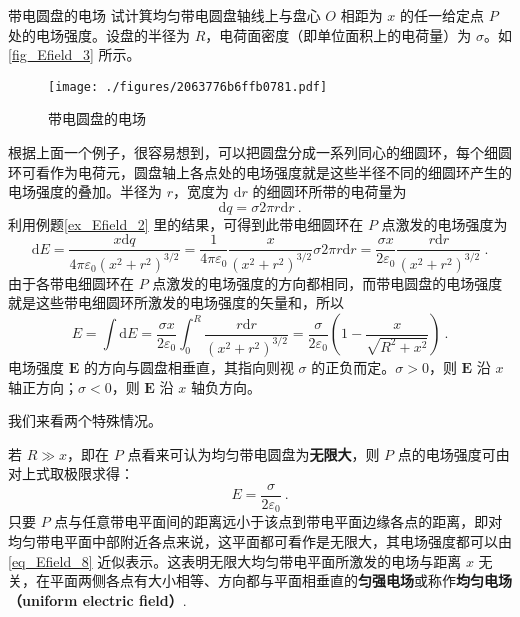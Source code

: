  
\begin{example}{带电圆盘的电场}\label{ex_Efield_3}
试计箕均匀带电圆盘轴线上与盘心 $O$ 相距为 $x$ 的任一给定点 $P$ 处的电场强度。设盘的半径为 $R$，电荷面密度（即单位面积上的电荷量）为 $\sigma$。如\autoref{fig_Efield_3} 所示。

\begin{figure}[ht]
\centering
\texttt{[image: ./figures/2063776b6ffb0781.pdf]}
\caption{带电圆盘的电场} \label{fig_Efield_3}
\end{figure}

根据上面一个例子，很容易想到，可以把圆盘分成一系列同心的细圆环，每个细圆环可看作为电荷元，圆盘轴上各点处的电场强度就是这些半径不同的细圆环产生的电场强度的叠加。半径为 $r$，宽度为 $\mathrm dr$ 的细圆环所带的电荷量为
\begin{equation}
\mathrm{d} q=\sigma 2 \pi r \mathrm{d} r~.
\end{equation}
利用例题\autoref{ex_Efield_2} 里的结果，可得到此带电细圆环在 $P$ 点激发的电场强度为
\begin{equation}
\mathrm{d} E=\frac{x \mathrm{d} q}{4 \pi \varepsilon_{0}\left(x^{2}+r^{2}\right)^{3 / 2}}=\frac{1}{4 \pi \varepsilon_{0}} \frac{x}{\left(x^{2}+r^{2}\right)^{3 / 2}} \sigma 2 \pi r \mathrm{d} r=\frac{\sigma x}{2 \varepsilon_{0}} \frac{r \mathrm{d} r}{\left(x^{2}+r^{2}\right)^{3 / 2}}~.
\end{equation}
由于各带电细圆环在 $P$ 点激发的电场强度的方向都相同，而带电圆盘的电场强度就是这些带电细圆环所激发的电场强度的矢量和，所以
\begin{equation}\label{eq_Efield_7}
E=\int \mathrm{d} E=\frac{\sigma x}{2 \varepsilon_{0}} \int_{0}^{R} \frac{r \mathrm{d} r}{\left(x^{2}+r^{2}\right)^{3 / 2}}=\frac{\sigma}{2 \varepsilon_{0}}\left(1-\frac{x}{\sqrt{R^{2}+x^{2}}}\right)~.
\end{equation}
电场强度 $\mathbf E$ 的方向与圆盘相垂直，其指向则视 $\sigma$ 的正负而定。$\sigma>0$，则 $\mathbf E$ 沿 $x$ 轴正方向；$\sigma<0$，则 $\mathbf E$ 沿 $x$ 轴负方向。

我们来看两个特殊情况。

若 $R\gg x$，即在 $P$ 点看来可认为均匀带电圆盘为\textbf{无限大}，则 $P$ 点的电场强度可由对上式取极限求得：
\begin{equation} \label{eq_Efield_8}
E=\frac{\sigma}{2 \varepsilon_{0}}~.
\end{equation}
只要 $P$ 点与任意带电平面间的距离远小于该点到带电平面边缘各点的距离，即对均匀带电平面中部附近各点来说，这平面都可看作是无限大，其电场强度都可以由\autoref{eq_Efield_8} 近似表示。这表明无限大均匀带电平面所激发的电场与距离 $x$ 无关，在平面两侧各点有大小相等、方向都与平面相垂直的\textbf{匀强电场}或称作\textbf{均匀电场（uniform electric field）}.


\end{example}
